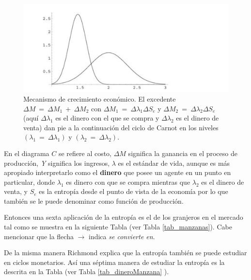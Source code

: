 \begin{figure}
	\centering
	\includegraphics[width=0.7\linewidth]{figures/image_2023_05_02T13_19_46_895Z}
	\caption{Mecanismo de crecimiento económico. El excedente $\Delta M	~=~\Delta M_1~+~\Delta M_2$ con 
	$\Delta M_1~=~\Delta \lambda_1\Delta S_e$ y $\Delta M_2~=~\Delta \lambda_2\Delta S_e$ (aquí $\Delta \lambda_1$ es el dinero con el que se compra y $\Delta \lambda_2$ es el dinero de venta) dan pie a la continuación del ciclo de Carnot en los niveles $(\lambda_1~=~ \Delta\lambda_1)$ y $(\lambda_2~=~ \Delta\lambda_2)$.}
	\label{entropia-Richmond}
\end{figure}


En el diagrama $C$ se refiere al costo, $\Delta M$ significa la ganancia en el proceso de producción,  \textit{Y} significa los ingresos, $\lambda$ es el estándar de vida, aunque es más apropiado interpretarlo como el \textbf{dinero} que posee un agente en un punto en particular, donde $\lambda_{1}$ es dinero con que se compra mientras que $\lambda_{2}$ es el dinero de venta, y $S_e$ es la entropía desde el punto de vista de la economía por lo que también se le puede denominar como función de producción.

Entonces una sexta aplicación de la entropía es el de los granjeros en el mercado tal como se muestra en la siguiente Tabla (ver Tabla \ref{tab_manzanas}). Cabe mencionar que la flecha $\rightarrow
$ indica \textit{se convierte en}.  

De la misma manera Richmond explica que la entropía también se puede estudiar en ciclos monetarios. Así una séptima manera de estudiar la entropía es la descrita en la Tabla (ver Tabla \ref{tab_dineroManzana} ). 

